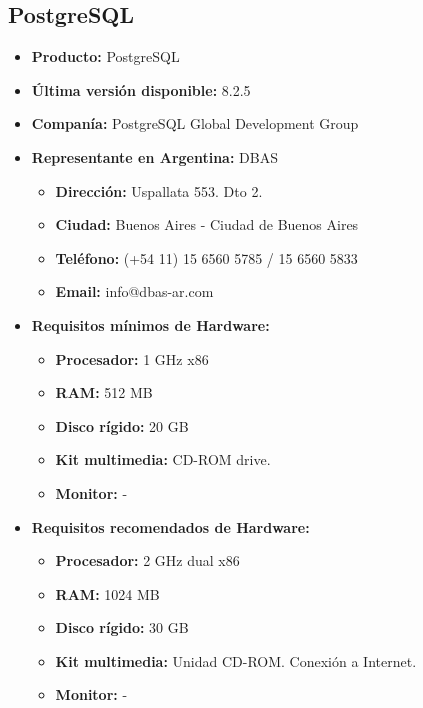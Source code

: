 \subsection{PostgreSQL}

\begin{itemize}
  \item \textbf{Producto:} PostgreSQL
  \item \textbf{Última versión disponible:} 8.2.5
  \item \textbf{Companía:} PostgreSQL Global Development Group

  \item \textbf{Representante en Argentina:} DBAS
    \begin{itemize}
      \item \textbf{Dirección:} Uspallata 553. Dto 2.
      \item \textbf{Ciudad:} Buenos Aires - Ciudad de Buenos Aires
      \item \textbf{Teléfono:} (+54 11) 15 6560 5785 / 15 6560 5833
      \item \textbf{Email:} info@dbas-ar.com
    \end{itemize}

  \item \textbf{Requisitos mínimos de Hardware:}
    \begin{itemize}
      \item \textbf{Procesador:} 1 GHz x86
      \item \textbf{RAM:} 512 MB
      \item \textbf{Disco rígido:} 20 GB
      \item \textbf{Kit multimedia:} CD-ROM drive.
      \item \textbf{Monitor:} - 
    \end{itemize}

  \item \textbf{Requisitos recomendados de Hardware:}
    \begin{itemize}
      \item \textbf{Procesador:} 2 GHz dual x86
      \item \textbf{RAM:} 1024 MB
      \item \textbf{Disco rígido:} 30 GB
      \item \textbf{Kit multimedia:} Unidad CD-ROM. Conexión a Internet.
      \item \textbf{Monitor:} - 
    \end{itemize}


\end{itemize}
